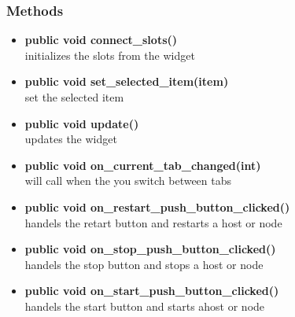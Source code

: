 \subsubsection{Methods}
\begin{itemize}
  \item \textbf{public void connect\_slots()}\\
  initializes the slots from the widget
  \item \textbf{public void set\_selected\_item(item)}\\
  set the selected item
  \item \textbf{public void update()}\\
  updates the widget
  \item \textbf{public void on\_current\_tab\_changed(int)}\\
  will call when the you switch between tabs
  \item \textbf{public void on\_restart\_push\_button\_clicked()}\\
  handels the retart button and restarts a host or node
  \item \textbf{public void on\_stop\_push\_button\_clicked()}\\
  handels the stop button and stops a host or node
  \item \textbf{public void on\_start\_push\_button\_clicked()}\\
  handels the start button and starts ahost or node
\end{itemize}



